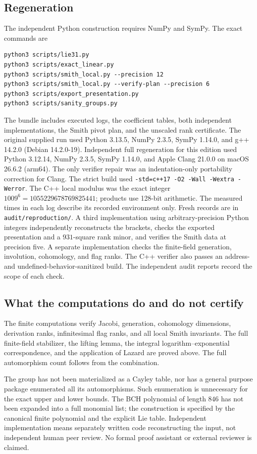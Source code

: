 \documentclass[11pt]{article}
\theoremstyle{definition}\newtheorem{definition}[theorem]{Definition}
\theoremstyle{remark}\newtheorem{remark}[theorem]{Remark}
\begin{document}
\subsection{Regeneration}
The independent Python construction requires NumPy and SymPy. The exact
commands are
\begin{verbatim}
python3 scripts/lie31.py
python3 scripts/exact_linear.py
python3 scripts/smith_local.py --precision 12
python3 scripts/smith_local.py --verify-plan --precision 6
python3 scripts/export_presentation.py
python3 scripts/sanity_groups.py
\end{verbatim}
The bundle includes executed logs, the coefficient tables, both independent
implementations, the Smith pivot plan, and the unscaled rank certificate.
The original supplied run used Python 3.13.5, NumPy 2.3.5, SymPy 1.14.0,
and g++ 14.2.0 (Debian 14.2.0-19). Independent full regeneration for this
edition used Python 3.12.14, NumPy 2.3.5, SymPy 1.14.0, and Apple Clang
21.0.0 on macOS 26.6.2 (arm64). The only verifier repair was an
indentation-only portability correction for Clang. The strict build used
\texttt{-std=c++17 -O2 -Wall -Wextra -Werror}.
The C++ local modulus was the exact integer
$1009^6=1055229678769825441$; products use 128-bit arithmetic.
The measured times in each log describe its recorded environment only.
Fresh records are in \texttt{audit/reproduction/}. A third implementation
using arbitrary-precision Python integers independently reconstructs the
brackets, checks the exported presentation and a $931$-square rank minor,
and verifies the Smith data at precision five. A separate implementation
checks the finite-field generation, involution, cohomology, and flag ranks.
The C++ verifier also passes an address- and undefined-behavior-sanitized
build. The independent audit reports record the scope of each check.

\subsection{What the computations do and do not certify}
The finite computations verify Jacobi, generation, cohomology dimensions,
derivation ranks, infinitesimal flag ranks, and all local Smith invariants.
The full finite-field stabilizer, the lifting lemma, the integral
logarithm--exponential correspondence, and the application of Lazard are
proved above. The full automorphism count follows from the combination.

The group has not been materialized as a Cayley table, nor has a general
purpose package enumerated all its automorphisms. Such enumeration is
unnecessary for the exact upper and lower bounds. The BCH polynomial of
length $846$ has not been expanded into a full monomial list; the construction
is specified by the canonical finite polynomial and the explicit Lie table.
Independent implementation means separately written code reconstructing the
input, not independent human peer review. No formal proof assistant or
external reviewer is claimed.
\end{document}
